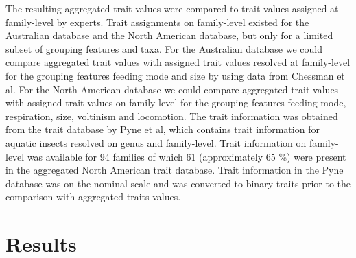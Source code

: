 \documentclass{article}
\begin{document}
The resulting aggregated trait values were compared to trait values assigned at family-level by experts. Trait assignments on family-level existed for the Australian database and the North American database, but only for a limited subset of grouping features and taxa. For the Australian database we could compare aggregated trait values with assigned trait values resolved at family-level for the grouping features feeding mode and size by using data from Chessman et al. %
For the North American database we could compare aggregated trait values with assigned trait values 
on family-level for the grouping features feeding mode, respiration, size, voltinism and locomotion. 
The trait information was obtained from the trait database by Pyne et al, which contains trait information
for aquatic insects resolved on genus and family-level. Trait information on family-level was available for 
94 families of which 61 (approximately 65 \%) were present in the aggregated North American trait database. 
Trait information in the Pyne database was on the nominal scale and was converted to binary traits prior to the comparison with aggregated traits values. 

\section{Results}
\end{document}
